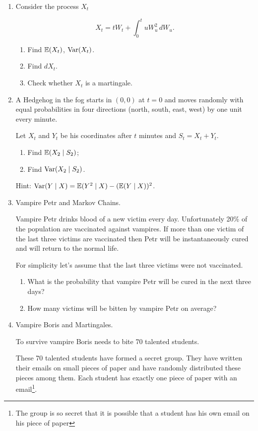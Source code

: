 \begin{enumerate}
\item Consider the process $X_t$

\[
X_t= tW_t + \int_0^t uW_u^2\, dW_u.
\]

\begin{enumerate}
    \item Find $\operatorname{\mathbb{E}}(X_t)$, $\operatorname{Var}(X_t)$.
    \item Find $dX_t$.
    \item Check whether $X_t$ is a martingale.
\end{enumerate}

\item A Hedgehog in the fog starts in $(0, 0)$ at $t=0$ and moves randomly with equal probabilities in four directions (north, south, east, west) by one unit every minute. 

Let $X_t$ and $Y_t$ be his coordinates after $t$ minutes and $S_t = X_t + Y_t$.

\begin{enumerate}
    \item Find $\operatorname{\mathbb{E}}(X_2 \mid S_2)$;
    \item Find $\operatorname{Var}(X_2 \mid S_2)$.
\end{enumerate}

Hint: $\operatorname{Var}(Y \mid X) = \operatorname{\mathbb{E}}(Y^2 \mid X) - (\operatorname{\mathbb{E}}(Y \mid X))^2$.

    \item Vampire Petr and Markov Chains. 
    
    Vampire Petr drinks blood of a new victim every day. 
    Unfortunately 20\% of the population are vaccinated against vampires. 
    If more than one victim of the last three victims are vaccinated then Petr will be instantaneously cured and will return to the normal life. 
 
    For simplicity let's assume that the last three victims were not vaccinated. 
    
    \begin{enumerate}
        \item What is the probability that vampire Petr will be cured in the next three days?
        \item How many victims will be bitten by vampire Petr on average?
    \end{enumerate}
 
    \item Vampire Boris and Martingales.
    
    To survive vampire Boris needs to bite 70 talented students. 
    
    These 70 talented students have formed a secret group. They have written their emails on small pieces of paper and have randomly distributed these pieces among them. Each student has exactly one piece of paper with an email\footnote{The group is so secret that it is possible that a student has his own email on his piece of paper}. 
    

\end{enumerate}
